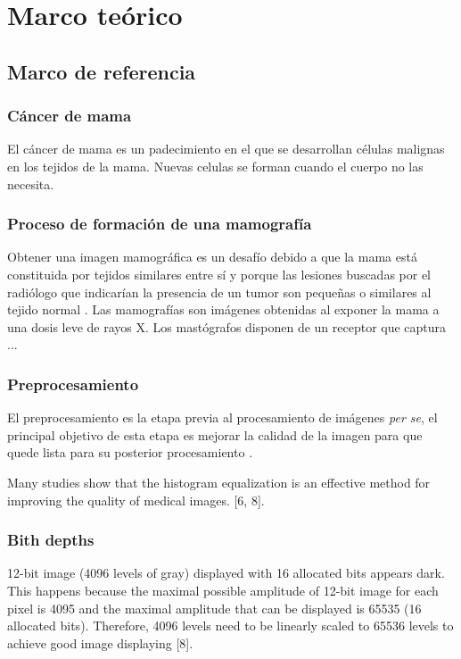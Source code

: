 \chapter{Marco teórico}

\section{Marco de referencia}

\subsection{Cáncer de mama} %
El cáncer de mama es un padecimiento en el que se desarrollan células malignas
en los tejidos de la mama. Nuevas celulas se forman cuando el cuerpo no las
necesita. 

\subsection{Proceso de formación de una mamografía}
Obtener una imagen mamográfica es un desafío debido a que la mama está
constituida por tejidos similares entre sí y porque las lesiones buscadas por
el radiólogo que indicarían la presencia de un tumor son pequeñas o similares
al tejido normal \cite{mx:cancer}. Las mamografías son imágenes obtenidas al
exponer la mama a una dosis leve de rayos X. Los mastógrafos disponen de un
receptor que captura ...

\subsection{Preprocesamiento}
El preprocesamiento es la etapa previa al procesamiento de imágenes \textit{per
se}, el principal objetivo de esta etapa es mejorar la calidad de la imagen
para que quede lista para su posterior procesamiento \cite{ponraj2011survey}.


Many studies show that the histogram equalization is an effective method for
improving the quality of medical images. [6, 8]. 

\subsection{Bith depths}

12-bit image (4096 levels of gray) displayed with 16 allocated bits appears
dark. This happens because the maximal possible amplitude of 12-bit image for
each pixel is 4095 and the maximal amplitude that can be displayed is 65535 (16
allocated bits). Therefore, 4096 levels need to be linearly scaled to 65536
levels to achieve good image displaying [8].


